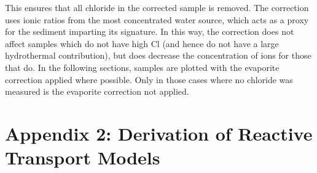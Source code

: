 This ensures that all chloride in the corrected sample is removed. The correction uses ionic ratios from the most concentrated water source, which acts as a proxy for the sediment imparting its signature.  In this way, the correction does not affect samples which do not have high Cl (and hence do not have a large hydrothermal contribution), but does decrease the concentration of ions for those that do. In the following sections, samples are plotted with the evaporite correction applied where possible. Only in those cases where no chloride was measured is the evaporite correction not applied.

\newpage


\section*{Appendix 2: Derivation of Reactive Transport Models}


